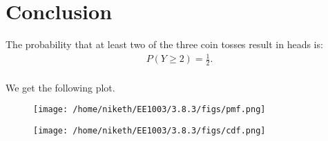\documentclass[journal]{IEEEtran}
\begin{document}
\section{Conclusion}
The probability that at least two of the three coin tosses result in heads is:
\begin{align}
P(Y \geq 2) = \frac{1}{2}.
\end{align}\\
We get the following plot.
\begin{figure}[!ht]
    \centering
    \texttt{[image: /home/niketh/EE1003/3.8.3/figs/pmf.png]}
    \caption{}
\end{figure}
\begin{figure}[!ht]
    \centering
    \texttt{[image: /home/niketh/EE1003/3.8.3/figs/cdf.png]}
    \caption{}
\end{figure}
\end{document}
